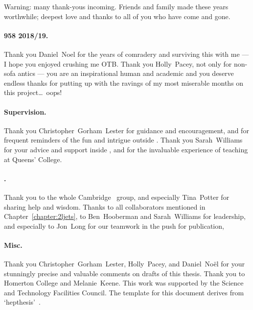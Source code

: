 \begin{acknowledgements}
Warning: many thank-yous incoming.
Friends and family made these years worthwhile;
deepest love and thanks to all of you who have come and gone.

\paragraph{958 2018/19.}
Thank you Daniel~Noel for the years of comradery and surviving this with me
--- I hope you enjoyed crushing me OTB.
Thank you Holly~Pacey, not only for non-sofa antics
--- you are an inspirational human and academic and you deserve endless thanks
for putting up with the ravings of my most miserable months on this
project\ldots\ oops!

\paragraph{Supervision.}
Thank you Christopher~Gorham~Lester for guidance and encouragement,
and for frequent reminders of the fun and intrigue outside \atlas.
Thank you Sarah~Williams for your advice and support inside \atlas, and
for the invaluable experience of teaching at Queens' College.

\paragraph{\atlas.}
Thank you to the whole Cambridge \atlas\ group, and especially Tina~Potter for
sharing help and wisdom.
Thanks to all collaborators mentioned in Chapter~\ref{chapter:2ljets},
to Ben~Hooberman and Sarah~Williams for leadership, and especially to
Jon~Long for our teamwork in the push for publication,

\paragraph{Misc.}
Thank you Christopher~Gorham~Lester, Holly~Pacey, and Daniel~No\"el for your
stunningly precise and valuable comments on drafts of this thesis.
Thank you to Homerton College and Melanie~Keene.
This work was supported by the Science and Technology Facilities Council.
The template for this document derives from `hepthesis'~\cite{hepthesis}.
\end{acknowledgements}


